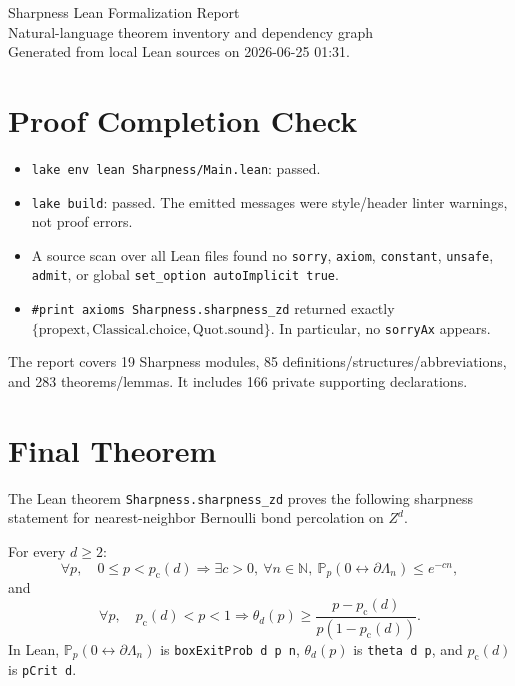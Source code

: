 \documentclass[10pt]{article}
\newcommand{\module}[1]{\texttt{#1}}
\newcommand{\pc}{p_{\mathrm{c}}}
\newcommand{\prob}{\mathbb P}
\begin{document}
\begin{center}
{\LARGE Sharpness Lean Formalization Report}\\[0.35em]
{\large Natural-language theorem inventory and dependency graph}\\[0.35em]
\small Generated from local Lean sources on 2026-06-25 01:31.
\end{center}
\section*{Proof Completion Check}

\begin{itemize}
\item \module{lake env lean Sharpness/Main.lean}: passed.
\item \module{lake build}: passed. The emitted messages were style/header linter warnings, not proof errors.
\item A source scan over all Lean files found no \module{sorry}, \module{axiom}, \module{constant}, \module{unsafe}, \module{admit}, or global \module{set\_option autoImplicit true}.
\item \module{\#print axioms Sharpness.sharpness\_zd} returned exactly \(\{\mathrm{propext},\mathrm{Classical.choice},\mathrm{Quot.sound}\}\). In particular, no \module{sorryAx} appears.
\end{itemize}

The report covers 19 Sharpness modules, 85 definitions/structures/abbreviations, and 283 theorems/lemmas. It includes 166 private supporting declarations.
\section*{Final Theorem}

The Lean theorem \module{Sharpness.sharpness\_zd} proves the following sharpness statement for nearest-neighbor Bernoulli bond percolation on \(Z^d\).

For every \(d\ge 2\):
\[
\forall p,\quad 0\le p<\pc(d)
\Longrightarrow
\exists c>0,\ \forall n\in\mathbb N,\ 
\prob_p(0\leftrightarrow\partial\Lambda_n)\le e^{-cn},
\]
and
\[
\forall p,\quad \pc(d)<p<1
\Longrightarrow
\theta_d(p)\ge
\frac{p-\pc(d)}{p(1-\pc(d))}.
\]
In Lean, \(\prob_p(0\leftrightarrow\partial\Lambda_n)\) is \module{boxExitProb d p n}, \(\theta_d(p)\) is \module{theta d p}, and \(\pc(d)\) is \module{pCrit d}.
\end{document}
